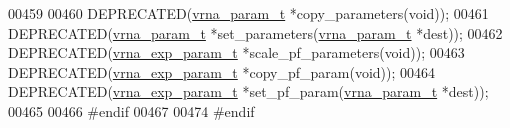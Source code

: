 \begin{DoxyCode}
00459 
00460 DEPRECATED(\hyperlink{group__energy__parameters_structvrna__param__s}{vrna\_param\_t}     *copy\_parameters(\textcolor{keywordtype}{void}));
00461 DEPRECATED(\hyperlink{group__energy__parameters_structvrna__param__s}{vrna\_param\_t}     *set\_parameters(\hyperlink{group__energy__parameters_structvrna__param__s}{vrna\_param\_t} *dest));
00462 DEPRECATED(\hyperlink{group__energy__parameters_structvrna__exp__param__s}{vrna\_exp\_param\_t} *scale\_pf\_parameters(\textcolor{keywordtype}{void}));
00463 DEPRECATED(\hyperlink{group__energy__parameters_structvrna__exp__param__s}{vrna\_exp\_param\_t} *copy\_pf\_param(\textcolor{keywordtype}{void}));
00464 DEPRECATED(\hyperlink{group__energy__parameters_structvrna__exp__param__s}{vrna\_exp\_param\_t} *set\_pf\_param(\hyperlink{group__energy__parameters_structvrna__param__s}{vrna\_param\_t} *dest));
00465 
00466 \textcolor{preprocessor}{#endif}
00467 
00474 \textcolor{preprocessor}{#endif}
\end{DoxyCode}
